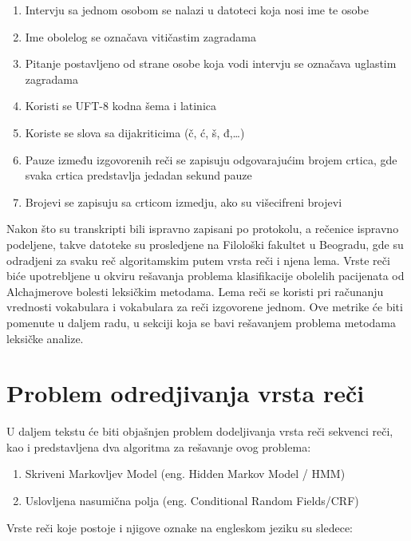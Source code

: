 \documentclass[12pt,oneside]{memoir}
\begin{document}
\begin{enumerate}
\item Intervju sa jednom osobom se nalazi u datoteci koja nosi ime te osobe
\item Ime obolelog se označava vitičastim zagradama 
\item Pitanje postavljeno od strane osobe koja vodi intervju se označava uglastim zagradama
\item Koristi se UFT-8 kodna šema i latinica
\item Koriste se slova sa dijakriticima (č, ć, š, đ,…)
\item Pauze između izgovorenih reči se zapisuju odgovarajućim brojem crtica,  gde svaka crtica predstavlja jedadan sekund pauze
\item Brojevi se zapisuju sa crticom izmedju,  ako su višecifreni brojevi
\end{enumerate}

Nakon što su transkripti bili ispravno zapisani po protokolu,  a rečenice ispravno podeljene,  takve datoteke su prosledjene na Filološki fakultet u Beogradu,  gde su odradjeni za svaku reč algoritamskim putem vrsta reči i njena lema.  Vrste reči biće upotrebljene u okviru rešavanja problema klasifikacije obolelih pacijenata od Alchajmerove bolesti leksičkim metodama.  Lema reči se koristi pri računanju vrednosti vokabulara i vokabulara za reči izgovorene jednom.  Ove metrike će biti pomenute u daljem radu, u sekciji koja se bavi rešavanjem problema metodama leksičke analize. 

\section{Problem odredjivanja vrsta reči}

U daljem tekstu će biti objašnjen problem dodeljivanja vrsta reči sekvenci reči,  kao i predstavljena dva algoritma za rešavanje ovog problema:
\begin{enumerate}
\item Skriveni Markovljev Model (eng. Hidden Markov Model / HMM)
\item Uslovljena nasumična polja (eng. Conditional Random Fields/CRF)
\end{enumerate}
\break
Vrste reči koje postoje i njigove oznake na engleskom jeziku su sledece:
\end{document}
